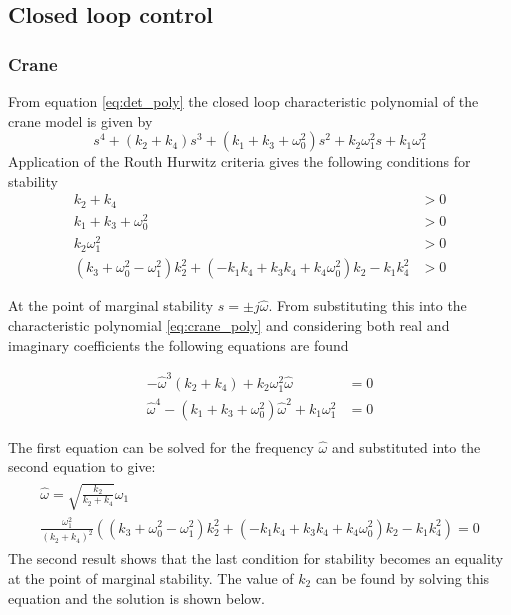 \documentclass{article}
\begin{document}
\subsection{Closed loop control}


\subsubsection{Crane}

From equation \ref{eq:det_poly} the closed loop characteristic polynomial of the crane model is given by
\begin{equation}
  s^{4} + \left(k_{2} + k_{4}\right) s^{3} + \left(k_{1} + k_{3} + \omega_{0}^{2}\right) s^{2} + k_{2} \omega_{1}^{2} s + k_{1} \omega_{1}^{2}
  \label{eq:crane_poly}
\end{equation}
Application of the Routh Hurwitz criteria gives the following conditions for stability
\begin{align}
  k_{2} + k_{4} &> 0 \\
  k_{1} + k_{3} + \omega_{0}^{2} &> 0 \\
  k_{2} \omega_{1}^{2} &> 0 \\
  \left(k_{3} + \omega_{0}^{2} - \omega_{1}^{2}\right) k_{2}^{2} + \left(- k_{1} k_{4} + k_{3} k_{4} + k_{4} \omega_{0}^{2}\right) k_{2} -  k_{1} k_{4}^{2} &> 0
\end{align}

At the point of marginal stability $s = \pm j\hat{\omega}$.
From substituting this into the characteristic polynomial \ref{eq:crane_poly} and considering both real and imaginary coefficients the following equations are found

\begin{align}
    - \hat{\omega}^{3} \left(k_{2} + k_{4}\right) + k_{2} \omega_{1}^{2} \hat{\omega}  &= 0 \\
    \hat{\omega}^{4} - \left(k_{1} + k_{3} + \omega_{0}^{2}\right)\hat{\omega}^{2} + k_{1} \omega_{1}^{2} &= 0
\end{align}

The first equation can be solved for the frequency $\hat{\omega}$ and substituted into the second equation to give:
\begin{align}
  \begin{gathered}
    \hat{\omega} = \sqrt{\frac{k_2}{k_2 + k_4}} \omega_1 \label{eq:marginal_stability_frequency}\\
    \frac{\omega_1^2}{(k_2+k_4)^2} \left( \left(k_{3} + \omega_{0}^{2} - \omega_{1}^{2}\right) k_{2}^{2} + \left(- k_{1} k_{4} + k_{3} k_{4} + k_{4} \omega_{0}^{2}\right) k_{2} -  k_{1} k_{4}^{2} \right) = 0
  \end{gathered}
\end{align}
The second result shows that the last condition for stability becomes an equality at the point of marginal stability.
The value of $k_2$ can be found by solving this equation and the solution is shown below.
\end{document}

